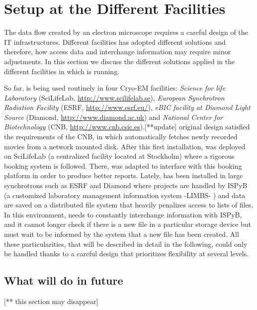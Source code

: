 \section{\scipion Setup at the Different Facilities}

The data flow created by an electron microscope requires a careful design of the IT infrastructures.  Different facilities has adopted different solutions and therefore, how \scipion  access data and interchange information may require minor adjustments. In this section we discuss  the different solutions applied in the different facilities in which \scipion is running.

So far, \scipion is being used routinely in four Cryo-EM facilities: \emph{Science for life Laboratory} (SciLifeLab, \url{http://www.scilifelab.se}),  \emph{European Synchrotron Radiation Facility} (ESRF, \url{http://www.esrf.eu/}), \emph{eBIC facility at Diamond Light Source} (Diamond, \url{http://www.diamond.ac.uk}) and \emph{National Center for Biotechnology} (CNB, \url{http://www.cnb.csic.es}).[**update] \scipion original design satisfied the requirements of the CNB, in which \scipion automatically fetches newly recorded movies from a network mounted disk. After this first installation, \scipion was deployed on SciLifeLab (a centralized facility located at Stockholm) where a rigorous booking system is followed. There, \scipion was adapted to interface with this booking platform in order to produce better reports. Lately,  \scipion has been installed in  large synchrotrons  such as ESRF and Diamond  where projects are handled by ISPyB (a customized laboratory management information system -LIMBS- \citep{Delageniere2011}) and data are saved on a distributed file system that heavily penalizes access to lists of files. In this environment, \scipion needs to constantly interchange information with ISPyB, and it cannot longer check if there is a new file in a particular storage device but must wait to be informed by the system that a new file has been created. All these particularities, that will be described in detail in the following, could only be handled thanks to a careful design that prioritizes flexibility at several levels. 







\subsection{What will do in future}
[** this section may disappear] 


